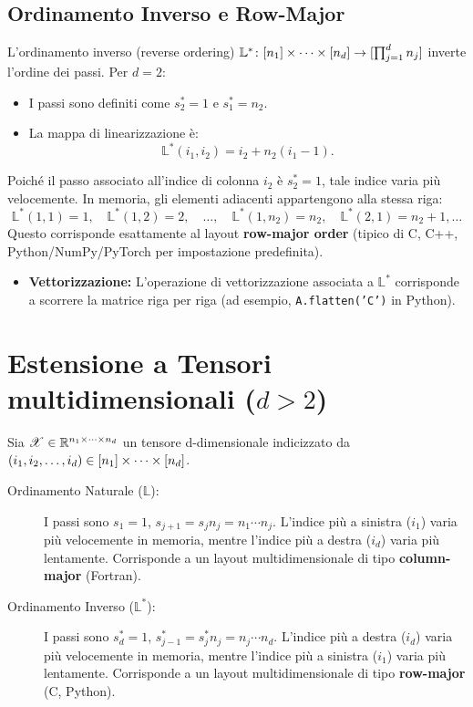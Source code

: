 \documentclass{article}
\renewcommand{\L}{\mathbb{L}}
\begin{document}
\subsection{Ordinamento Inverso e Row-Major}
L'ordinamento inverso (reverse ordering) $\L^* \colon \mdom! \to [\prod_{j=1}^d n_j]$ inverte l'ordine dei passi. Per $d=2$:
\begin{itemize}
    \item I passi sono definiti come $s_2^* = 1$ e $s_1^* = n_2$.
    \item La mappa di linearizzazione è:
    \[
    \L^*(i_1, i_2) = i_2 + n_2 (i_1 - 1).
    \]
\end{itemize}
Poiché il passo associato all'indice di colonna $i_2$ è $s_2^* = 1$, tale indice varia più velocemente. In memoria, gli elementi adiacenti appartengono alla stessa riga:
\[
\L^*(1,1) = 1, \quad \L^*(1,2) = 2, \quad \dots, \quad \L^*(1,n_2) = n_2, \quad \L^*(2,1) = n_2 + 1, \dots
\]
Questo corrisponde esattamente al layout \textbf{row-major order} (tipico di C, C++, Python/NumPy/PyTorch per impostazione predefinita).
\begin{itemize}
    \item \textbf{Vettorizzazione:} L'operazione di vettorizzazione associata a $\L^*$ corrisponde a scorrere la matrice riga per riga (ad esempio, \texttt{A.flatten('C')} in Python).
\end{itemize}

\section{Estensione a Tensori multidimensionali ($d > 2$)}

Sia $\Tn{X} \in \Rmsiz!$ un tensore d-dimensionale indicizzato da $(\miwc) \in \mdom!$.

\begin{description}
    \item[Ordinamento Naturale ($\L$):] I passi sono $s_1 = 1$, $s_{j+1} = s_j n_j = n_1 \cdots n_j$. L'indice più a sinistra ($i_1$) varia più velocemente in memoria, mentre l'indice più a destra ($i_d$) varia più lentamente. Corrisponde a un layout multidimensionale di tipo \textbf{column-major} (Fortran).
    \item[Ordinamento Inverso ($\L^*$):] I passi sono $s_d^* = 1$, $s_{j-1}^* = s_j^* n_j = n_j \cdots n_d$. L'indice più a destra ($i_d$) varia più velocemente in memoria, mentre l'indice più a sinistra ($i_1$) varia più lentamente. Corrisponde a un layout multidimensionale di tipo \textbf{row-major} (C, Python).
\end{description}
\end{document}
